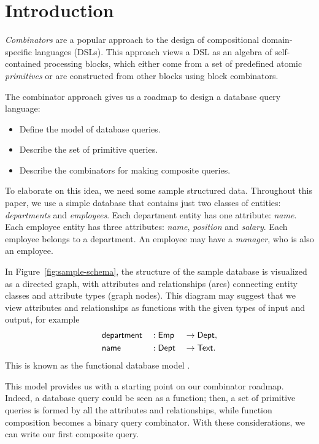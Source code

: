 
\section{Introduction}
\label{sec:introduction}

\emph{Combinators} are a popular approach to the design of compositional
domain-specific languages (DSLs). This approach views a DSL as an algebra of
self-con\-tained processing blocks, which either come from a set of predefined
atomic \emph{primitives} or are constructed from other blocks using block
combinators.

The combinator approach gives us a roadmap to design a database query language:

\begin{itemize}
\item
Define the model of database queries.

\item
Describe the set of primitive queries.

\item
Describe the combinators for making composite queries.
\end{itemize}

To elaborate on this idea, we need some sample structured data.  Throughout
this paper, we use a simple database that contains just two classes of
entities: \emph{departments} and \emph{employees}.  Each department entity has
one attribute: \emph{name}.  Each employee entity has three attributes:
\emph{name}, \emph{position} and \emph{salary}.  Each employee belongs to a
department.  An employee may have a \emph{manager}, who is also an employee.

In Figure~\ref{fig:sample-schema}, the structure of the sample database is
visualized as a directed graph, with attributes and relationships (arcs)
connecting entity classes and attribute types (graph nodes).  This diagram may
suggest that we view attributes and relationships as functions with the given
types of input and output, for example
\begin{alignat*}{3}
    & \mathsf{department} && : \mathsf{Emp} && \to \mathsf{Dept}, \\
    & \mathsf{name} && : \mathsf{Dept} && \to \mathsf{Text}.
\end{alignat*}
This is known as the functional database model \cite{Kerschberg1976,
Sibley1977}.



This model provides us with a starting point on our combinator roadmap.
Indeed, a database query could be seen as a function; then, a set of primitive
queries is formed by all the attributes and relationships, while function
composition becomes a binary query combinator.  With these considerations, we
can write our first composite query.

